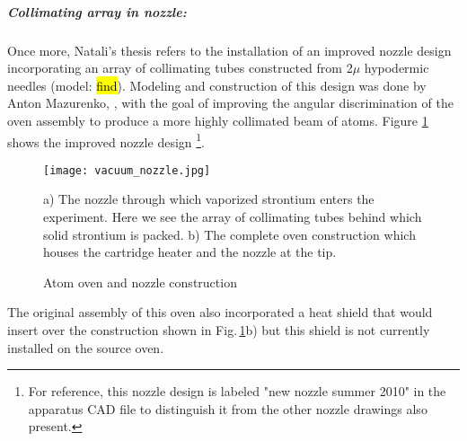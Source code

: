 \subparagraph{Collimating array in nozzle:}
Once more, Natali's thesis refers to the installation of an improved nozzle design incorporating an array of collimating tubes constructed from 2$\mu$ hypodermic needles (model: \hl{find}). 
Modeling and construction of this design was done by Anton Mazurenko, \cite{Mazurenko2010}, with the goal of improving the angular discrimination of the oven assembly to produce a more highly collimated beam of atoms.
Figure \ref{fig:2010_nozzle} shows the improved nozzle design \footnote{For reference, this nozzle design is labeled "new nozzle summer 2010" in the apparatus CAD file to distinguish it from the other nozzle drawings also present.}.
	\begin{figure}
		\centerline{
		\texttt{[image: vacuum\_nozzle.jpg]}}
		\caption{Atom oven and nozzle construction}{a) The nozzle through which vaporized strontium enters the experiment. Here we see the array of collimating tubes behind which solid strontium is packed. b) The complete oven construction which houses the cartridge heater and the nozzle at the tip.}
		\label{fig:2010_nozzle}
	\end{figure}
The original assembly of this oven also incorporated a heat shield that would insert over the construction shown in Fig.\,\ref{fig:2010_nozzle}b) but this shield is not currently installed on the source oven.
 
